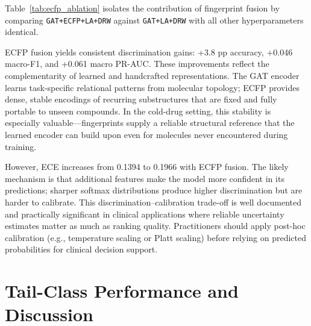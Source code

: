 \documentclass[11pt,a4paper]{report}
\begin{document}
Table~\ref{tab:ecfp_ablation} isolates the contribution of fingerprint fusion by comparing \texttt{GAT+ECFP+LA+DRW} against \texttt{GAT+LA+DRW} with all other hyperparameters identical.

\begin{table}[H]
\centering
\caption{Ablation: ECFP fusion under identical logit adjustment and DRW. Mean across five folds.}
\label{tab:ecfp_ablation}
\end{table}

ECFP fusion yields consistent discrimination gains: +3.8 pp accuracy, +0.046 macro-F1, and +0.061 macro PR-AUC. These improvements reflect the complementarity of learned and handcrafted representations. The GAT encoder learns task-specific relational patterns from molecular topology; ECFP provides dense, stable encodings of recurring substructures that are fixed and fully portable to unseen compounds. In the cold-drug setting, this stability is especially valuable---fingerprints supply a reliable structural reference that the learned encoder can build upon even for molecules never encountered during training.

However, ECE increases from 0.1394 to 0.1966 with ECFP fusion. The likely mechanism is that additional features make the model more confident in its predictions; sharper softmax distributions produce higher discrimination but are harder to calibrate. This discrimination--calibration trade-off is well documented and practically significant in clinical applications where reliable uncertainty estimates matter as much as ranking quality. Practitioners should apply post-hoc calibration (e.g., temperature scaling or Platt scaling) before relying on predicted probabilities for clinical decision support.

\section{Tail-Class Performance and Discussion}
\end{document}
